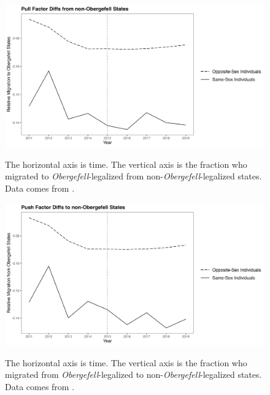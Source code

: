 \documentclass[12pt,letterpaper]{article}
\begin{document}
\begin{figure}[htbp]
    \centering
    \caption{}
    \label{fig: flows_post_diffs}
    \includegraphics[width=.75\linewidth]{outputs/summary_stats/flows_post_diffs.png}

    \vspace{0.5em}
    \begin{minipage}{0.75\linewidth}
        \footnotesize The horizontal axis is time. The vertical axis is the fraction who migrated to \textit{Obergefell}-legalized from non-\textit{Obergefell}-legalized states. Data comes from \citet{28}.
    \end{minipage}
\end{figure}
\begin{figure}[htbp]
    \centering
    \caption{}
    \label{fig: flows_ante_diffs}
    \includegraphics[width=.75\linewidth]{outputs/summary_stats/flows_ante_diffs.png}

    \vspace{0.5em}
    \begin{minipage}{0.75\linewidth}
        \footnotesize The horizontal axis is time. The vertical axis is the fraction who migrated from \textit{Obergefell}-legalized to non-\textit{Obergefell}-legalized states. Data comes from \citet{28}.
    \end{minipage}
\end{figure}
\end{document}
